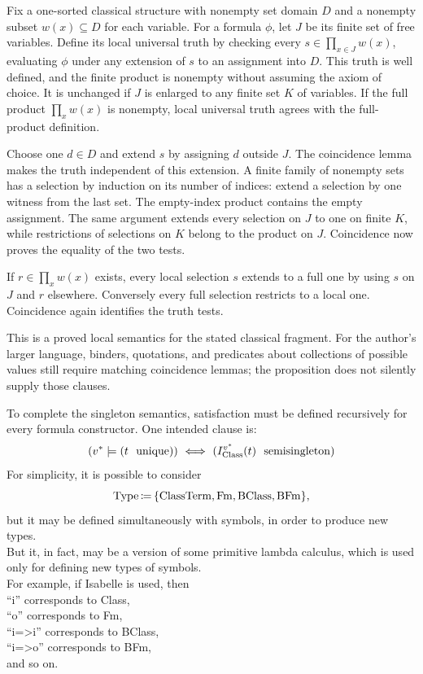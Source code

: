 \begin{proposition}
Fix a one-sorted classical structure with nonempty set domain $D$ and
a nonempty subset $w(x)\subseteq D$ for each variable. For a formula
$\phi$, let $J$ be its finite set of free variables. Define its local
universal truth by checking every $s\in\prod_{x\in J}w(x)$, evaluating
$\phi$ under any extension of $s$ to an assignment into $D$.
This truth is well defined, and the finite product is nonempty without
assuming the axiom of choice. It is unchanged if $J$ is enlarged to any
finite set $K$ of variables. If the full product $\prod_xw(x)$ is
nonempty, local universal truth agrees with the full-product definition.
\end{proposition}
\Proof
Choose one $d\in D$ and extend $s$ by assigning $d$ outside $J$.
The coincidence lemma makes the truth independent of this extension.
A finite family of nonempty sets has a selection by induction on its
number of indices: extend a selection by one witness from the last set.
The empty-index product contains the empty assignment. The same argument
extends every selection on $J$ to one on finite $K$, while restrictions
of selections on $K$ belong to the product on $J$. Coincidence now proves
the equality of the two tests.

If $r\in\prod_xw(x)$ exists, every local selection $s$ extends to a full
one by using $s$ on $J$ and $r$ elsewhere. Conversely every full selection
restricts to a local one. Coincidence again identifies the truth tests.
\Done

This is a proved local semantics for the stated classical fragment.
For the author's larger language, binders, quotations, and predicates
about collections of possible values still require matching coincidence
lemmas; the proposition does not silently supply those clauses.

To complete the singleton semantics, satisfaction must be defined
recursively for every formula constructor. One intended clause is:
\[
(v^*\models(t\ \lunique))\IFF (I^{v^*}_\Class(t)\ \semisingleton)
\]
For simplicity, it is possible to consider
\[
\mathrm{Type} \,{\coloneqq}\, \{{\text{ClassTerm}}, \mathrm{Fm}, \mathrm{BClass}, \mathrm{BFm} \},
\]
but it may be defined simultaneously with symbols, in order to produce new types.\\
But it, in fact, may be a version of some primitive lambda calculus, which is used only for defining new types of symbols.\\

For example, if Isabelle is used, then\\
``i'' corresponds to Class,\\
``o'' corresponds to Fm,\\
``i=>i'' corresponds to BClass,\\
``i=>o'' corresponds to BFm,\\
and so on.\\

